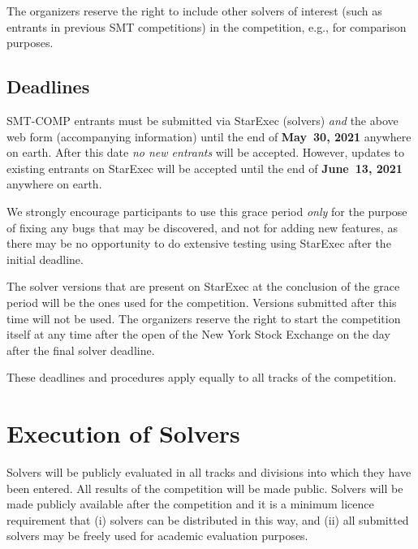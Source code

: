 \documentclass[12pt]{article}
\begin{document}
%
The organizers reserve the right to include other solvers of interest
(such as entrants in previous SMT competitions) in the competition,
e.g., for comparison purposes.

%


\subsection*{Deadlines}

SMT-COMP entrants must be submitted via StarExec (solvers) \emph{and}
the above web form (accompanying information) until the end of
{\bf May~30, 2021} anywhere on earth.
After this date \emph{no new entrants} will be accepted.
However, updates to existing entrants on StarExec
will be accepted until the end of {\bf June~13, 2021} anywhere on earth.

We strongly encourage participants to use this grace period
\emph{only} for the purpose of fixing any bugs that may be discovered,
and not for adding new features, as there may be no opportunity to do
extensive testing using StarExec after the initial deadline.

The solver versions that are present on StarExec at the conclusion of
the grace period will be the ones used for the competition.  Versions
submitted after this time will not be used.  The organizers reserve
the right to start the competition itself at any time after the open
of the New York Stock Exchange on the day after the final solver
deadline.

These deadlines and procedures apply equally to all tracks of the
competition.




\section{Execution of Solvers}

Solvers will be publicly evaluated in all tracks and divisions into
which they have been entered.  All results of the competition will be
made public. Solvers will be made publicly available after the competition and it is a minimum licence requirement that (i) solvers can be distributed in this way, and (ii) all submitted solvers may be freely used for academic evaluation purposes.
\end{document}
